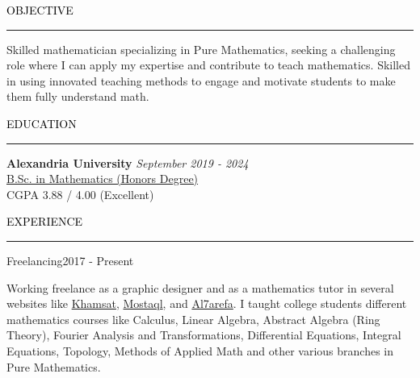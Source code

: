 \documentclass{resume} %
\renewenvironment{rSection}[1]{
\sectionskip
\textcolor{black}{\MakeUppercase{#1}}
\sectionlineskip
\hrule
\begin{list}{}{
\setlength{\leftmargin}{1.5em}
}
\item[]
}{
\end{list}
}
\begin{document}
\begin{rSection}{Objective}
     Skilled mathematician specializing in Pure Mathematics, seeking a challenging role where I can apply my expertise and contribute to teach mathematics. Skilled in using innovated teaching methods to engage and motivate students to make them fully understand math. 
\end{rSection}


\begin{rSection}{Education}
{\bf Alexandria University} \hfill {\em September 2019 - 2024} 
\\ \href{https://drive.google.com/file/d/1F50DDXvgqMtAoCs6Qjr5yMD2jWmPWW3m/view?usp=sharing}{\color{blue}B.Sc. in Mathematics (Honors Degree)} \hfill
\\ CGPA 3.88 / 4.00 (Excellent) \hfill
\end{rSection}



\begin{rSection}{Experience}
\begin{rSubsection}{Freelancing}{2017 - Present}{}{}
\item Working freelance as a graphic designer and as a mathematics tutor in several websites like \href{https://khamsat.com/user/hazem_hosam}{\color{blue}Khamsat}, \href{https://mostaql.com/u/Hazem_Hosam}{\color{blue}Mostaql}, 
 and \href{https://www.elharefa.com/en/freelancers/p/hazemhossam}{\color{blue}Al7arefa}. I taught college students different mathematics courses like Calculus, Linear Algebra, Abstract Algebra (Ring Theory), Fourier Analysis and Transformations, Differential Equations, Integral Equations, Topology, Methods of Applied Math and  other various branches in Pure Mathematics.
\end{rSubsection}
\end{rSection}
\end{document}
